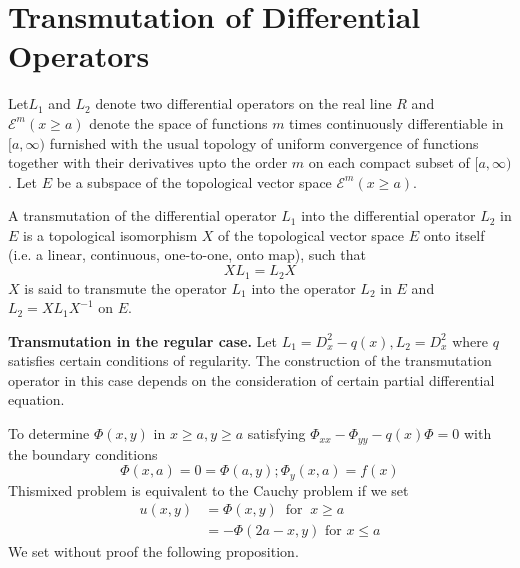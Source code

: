 
\chapter{Transmutation of Differential Operators}\label{part1:chap2} %

Let\pageoriginale $L_1$ and $L_2$ denote two differential operators on the real line
$R$ and $\mathscr{E}^m(x \geq a)$ denote the space of functions $m$
times continuously differentiable in $[ a, \infty)$ furnished with the
  usual topology of uniform convergence of functions together with
  their derivatives upto the order $m$ on each compact subset of $[a,
    \infty)$. Let $E$ be a subspace of the topological vector space
    $\mathscr{E}^m(x \geq a)$. 

\begin{defi*}
  A transmutation of the differential operator $L_1$ into the
  differential operator $L_2$ in $E$ is a topological isomorphism $X$
  of the topological vector space $E$ onto itself (i.e. a linear,
  continuous, one-to-one, onto map), such that 
  $$
  XL_1 = L_2X
  $$
  $X$ is said to transmute the operator $L_1$ into the operator $L_2$
  in $E$ and $L_2 = XL_1 X^{-1}$ on $E$. 
\end{defi*}

\noindent
\textbf{Transmutation in the regular case.} Let $L_1 = D^2_x -q(x),
L_2 = D^2_x$ where $q$ satisfies certain conditions of regularity. The
construction of the transmutation operator in this case depends on the
consideration of certain partial differential equation. 

\begin{prob}\label{part1:chap2:prob1} %
  To determine $\Phi(x,y)$ in $x \geq a, y \geq a$ satisfying
  $\Phi_{xx}- \Phi_{yy} -q(x) \Phi=0$ with the boundary conditions 
  $$
  \Phi(x, a) = 0 = \Phi (a, y); \Phi_y(x, a) =f(x)
  $$
  This\pageoriginale mixed problem is equivalent to the Cauchy problem if we set
  \begin{align*}
    u(x,y) & = \Phi (x,y)~ \text{ for }~ x \geq a \\
    & = -\Phi (2a-x,y) \text{ for } x \leq a
  \end{align*}
  We set without proof the following proposition.
\end{prob}

